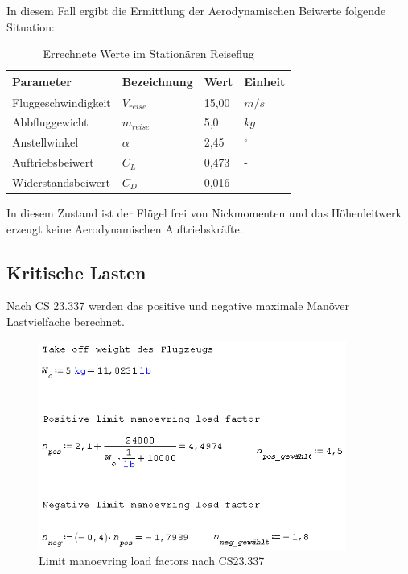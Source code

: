 In diesem Fall ergibt die Ermittlung der Aerodynamischen Beiwerte folgende Situation:

\begin{table}[h]
\centering
\begin{tabular}{|l|l|l|l|}
\hline
Parameter  & Bezeichnung &  Wert & Einheit \\ \hline
Fluggeschwindigkeit  & $V_{reise}$ & 15,00 & $m/s$\\ \hline
Abbfluggewicht & $m_{reise}$  & 5,0 & $kg$\\ \hline
Anstellwinkel & $\alpha$ & 2,45 & $^\circ$ \\ \hline
Auftriebsbeiwert & $C_{L}$ & 0,473 & -\\ \hline
Widerstandsbeiwert & $C_{D}$ & 0,016  & -  \\ \hline
\end{tabular}
\caption{Errechnete Werte im Stationären Reiseflug}
\label{tab:Errechnete Werte im Stationären Reiseflug}
\end{table}

In diesem Zustand ist der Flügel frei von Nickmomenten und das Höhenleitwerk erzeugt keine Aerodynamischen Auftriebskräfte.



\subsection{Kritische Lasten}

Nach CS 23.337 werden das positive und negative maximale Manöver Lastvielfache berechnet.
\begin{figure}[H]
\centering
\includegraphics[width=0.9\textwidth]{bilder/Formeln/Kritische_Lastfaelle_Manoeverlasten.png}
\caption{Limit manoevring load factors nach CS23.337} 
\label{fig:Limit manoevring load factors nach CS23.337}
\end{figure}

